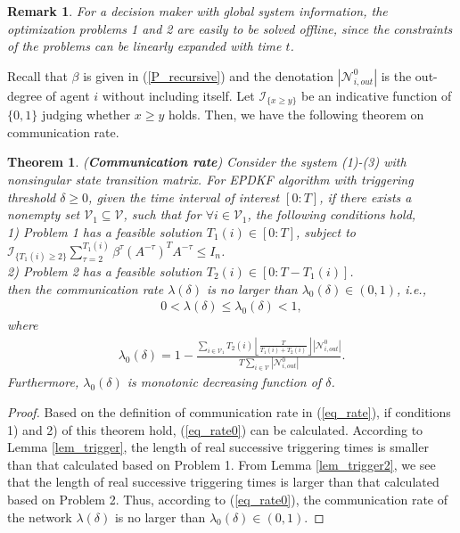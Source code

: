 \documentclass[journal,transmag]{IEEEtran}
\newtheorem{remark}{\textbf{Remark}}
\newtheorem{theorem}{\textbf{Theorem}}
\begin{document}
{\begin{remark}
	For a decision maker with global system information, the optimization problems 1 and 2 are easily to be solved offline, since the constraints of the problems can be linearly expanded with time $t$.
\end{remark}
Recall that $\beta$ is given in (\ref{P_recursive}) and  the denotation  $|\mathcal{N}_{i,out}^0|$  is the out-degree of agent $i$ without including itself. 
Let $\mathcal{I}_{ \{x\geq y\}}$ be an indicative function of $\{0,1\}$ judging whether $x\geq y$ holds.
Then, we have the following theorem on communication rate. 
\begin{theorem}\label{thm_rate}
		(\textbf{Communication rate}) 
	Consider the system (1)-(3) with nonsingular state transition matrix. For EPDKF algorithm with triggering threshold $\delta\geq 0$, 
   given the time interval of interest  $[0:T]$, 
	if there exists a nonempty set $\mathcal{V}_1\subseteq \mathcal{V}$, such that for $\forall i\in\mathcal{V}_1$, 
	the following conditions hold,\\
1) Problem 1 has a feasible solution $T_1(i)\in [0:T]$, subject to $\mathcal{I}_{\{T_1(i)\geq 2\}}\sum_{\tau=2}^{T_1(i)} \beta^{\tau}(A^{-\tau})^{T}A^{-\tau}\leq I_{n}$.  	\\
2) Problem 2 has a feasible solution $T_2(i)\in [0:T-T_1(i)]$. \\
then the communication rate $\lambda (\delta)$ is no larger than $\lambda_0(\delta)\in(0,1)$, i.e.,
\begin{align}
0<\lambda (\delta)\leq \lambda_0(\delta)<1,
\end{align}
where 
\begin{align}\label{eq_rate0}
\lambda_0(\delta)=1-\frac{\sum_{i\in\mathcal{V}_1}T_{2}(i)\left\lfloor\frac{T}{T_{1}(i)+T_{2}(i)}\right\rfloor |\mathcal{N}_{i,out}^0| }{T\sum_{i\in\mathcal{V}}|\mathcal{N}_{i,out}^0|}.
\end{align}
Furthermore, $\lambda_0(\delta)$ is  monotonic decreasing function of $\delta$.
\end{theorem}
\begin{proof}
Based on the definition of communication rate in (\ref{eq_rate}), if conditions 1) and 2) of this theorem hold,  (\ref{eq_rate0}) can be calculated.  
According to Lemma \ref{lem_trigger}, the  length of real successive triggering times is smaller than that calculated based on  Problem 1. From Lemma \ref{lem_trigger2}, 	we see that the  length of real successive triggering times is larger than that calculated based on  Problem 2. Thus, according to (\ref{eq_rate0}), the communication rate of the network $\lambda (\delta)$ is no larger than $\lambda_0(\delta)\in(0,1)$. 


\end{proof}}
\end{document}
